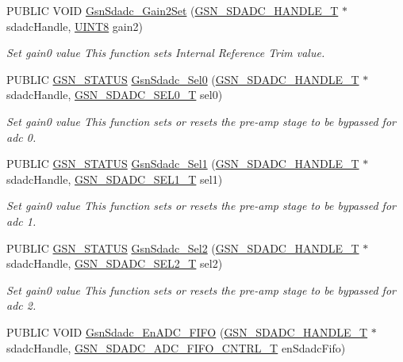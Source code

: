 \begin{DoxyCompactItemize}
PUBLIC VOID \hyperlink{a00652_gad175282ee968f03610da89e97679f271}{GsnSdadc\_\-Gain2Set} (\hyperlink{a00214}{GSN\_\-SDADC\_\-HANDLE\_\-T} $\ast$sdadcHandle, \hyperlink{a00660_gab27e9918b538ce9d8ca692479b375b6a}{UINT8} gain2)
\begin{DoxyCompactList}\small\item\em Set gain0 value This function sets Internal Reference Trim value. \end{DoxyCompactList}\item 
PUBLIC \hyperlink{a00660_gada5951904ac6110b1fa95e51a9ddc217}{GSN\_\-STATUS} \hyperlink{a00652_ga667622c288ed2b8c3319c4724cb78639}{GsnSdadc\_\-Sel0} (\hyperlink{a00214}{GSN\_\-SDADC\_\-HANDLE\_\-T} $\ast$sdadcHandle, \hyperlink{a00652_ga1211f3eac3c8c6697324a356da4dbcb7}{GSN\_\-SDADC\_\-SEL0\_\-T} sel0)
\begin{DoxyCompactList}\small\item\em Set gain0 value This function sets or resets the pre-\/amp stage to be bypassed for adc 0. \end{DoxyCompactList}\item 
PUBLIC \hyperlink{a00660_gada5951904ac6110b1fa95e51a9ddc217}{GSN\_\-STATUS} \hyperlink{a00652_ga7a72fd1faaa79943f28aa6492c0a829d}{GsnSdadc\_\-Sel1} (\hyperlink{a00214}{GSN\_\-SDADC\_\-HANDLE\_\-T} $\ast$sdadcHandle, \hyperlink{a00652_ga851e1269993bbdc128b392fd7216ade7}{GSN\_\-SDADC\_\-SEL1\_\-T} sel1)
\begin{DoxyCompactList}\small\item\em Set gain0 value This function sets or resets the pre-\/amp stage to be bypassed for adc 1. \end{DoxyCompactList}\item 
PUBLIC \hyperlink{a00660_gada5951904ac6110b1fa95e51a9ddc217}{GSN\_\-STATUS} \hyperlink{a00652_ga782d3ae7b52dc4521f12de44613ef2a0}{GsnSdadc\_\-Sel2} (\hyperlink{a00214}{GSN\_\-SDADC\_\-HANDLE\_\-T} $\ast$sdadcHandle, \hyperlink{a00652_ga21776f699fb060e738c464107e435df4}{GSN\_\-SDADC\_\-SEL2\_\-T} sel2)
\begin{DoxyCompactList}\small\item\em Set gain0 value This function sets or resets the pre-\/amp stage to be bypassed for adc 2. \end{DoxyCompactList}\item 
PUBLIC VOID \hyperlink{a00652_ga663bc61db73e496a016f93cc8c899668}{GsnSdadc\_\-EnADC\_\-FIFO} (\hyperlink{a00214}{GSN\_\-SDADC\_\-HANDLE\_\-T} $\ast$sdadcHandle, \hyperlink{a00652_gaf55aace91b55b8544afeb27482cc70d4}{GSN\_\-SDADC\_\-ADC\_\-FIFO\_\-CNTRL\_\-T} enSdadcFifo)

\end{DoxyCompactItemize}
